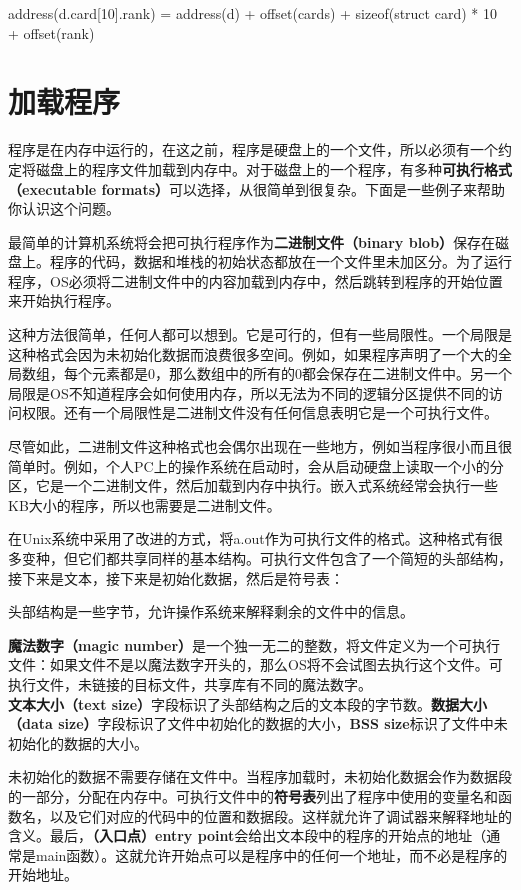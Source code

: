 \documentclass[cn,11pt,chinese]{elegantbook}
\begin{document}
address(d.card[10].rank) =
        address(d)
        + offset(cards)
        + sizeof(struct card) * 10
        + offset(rank)

\section{加载程序}

程序是在内存中运行的，在这之前，程序是硬盘上的一个文件，所以必须有一个约定将磁盘上的程序文件加载到内存中。对于磁盘上的一个程序，有多种\textbf{可执行格式（executable formats）}可以选择，从很简单到很复杂。下面是一些例子来帮助你认识这个问题。

最简单的计算机系统将会把可执行程序作为\textbf{二进制文件（binary blob）}保存在磁盘上。程序的代码，数据和堆栈的初始状态都放在一个文件里未加区分。为了运行程序，OS必须将二进制文件中的内容加载到内存中，然后跳转到程序的开始位置来开始执行程序。

这种方法很简单，任何人都可以想到。它是可行的，但有一些局限性。一个局限是这种格式会因为未初始化数据而浪费很多空间。例如，如果程序声明了一个大的全局数组，每个元素都是0，那么数组中的所有的0都会保存在二进制文件中。另一个局限是OS不知道程序会如何使用内存，所以无法为不同的逻辑分区提供不同的访问权限。还有一个局限性是二进制文件没有任何信息表明它是一个可执行文件。

尽管如此，二进制文件这种格式也会偶尔出现在一些地方，例如当程序很小而且很简单时。例如，个人PC上的操作系统在启动时，会从启动硬盘上读取一个小的分区，它是一个二进制文件，然后加载到内存中执行。嵌入式系统经常会执行一些KB大小的程序，所以也需要是二进制文件。

在Unix系统中采用了改进的方式，将a.out作为可执行文件的格式。这种格式有很多变种，但它们都共享同样的基本结构。可执行文件包含了一个简短的头部结构，接下来是文本，接下来是初始化数据，然后是符号表：

头部结构是一些字节，允许操作系统来解释剩余的文件中的信息。

\textbf{魔法数字（magic number）}是一个独一无二的整数，将文件定义为一个可执行文件：如果文件不是以魔法数字开头的，那么OS将不会试图去执行这个文件。可执行文件，未链接的目标文件，共享库有不同的魔法数字。\textbf{文本大小（text size）}字段标识了头部结构之后的文本段的字节数。\textbf{数据大小（data size）}字段标识了文件中初始化的数据的大小，\textbf{BSS size}标识了文件中未初始化的数据的大小。

未初始化的数据不需要存储在文件中。当程序加载时，未初始化数据会作为数据段的一部分，分配在内存中。可执行文件中的\textbf{符号表}列出了程序中使用的变量名和函数名，以及它们对应的代码中的位置和数据段。这样就允许了调试器来解释地址的含义。最后，\textbf{（入口点）entry point}会给出文本段中的程序的开始点的地址（通常是main函数）。这就允许开始点可以是程序中的任何一个地址，而不必是程序的开始地址。
\end{document}
